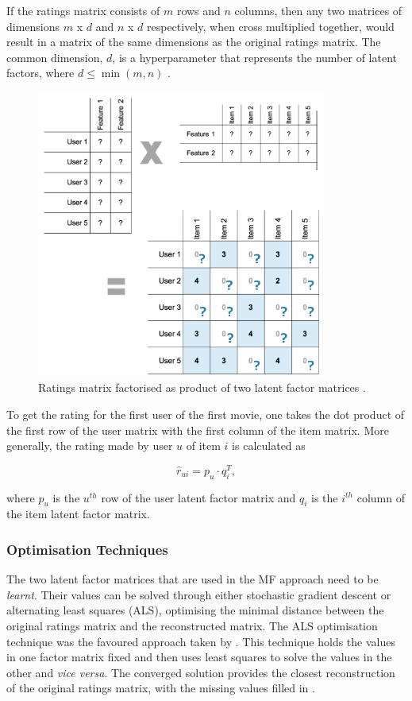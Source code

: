 If the ratings matrix consists of $m$ rows and $n$ columns, then any two matrices of dimensions $m$ x $d$ and $n$ x $d$ respectively, when cross multiplied together, would result in a matrix of the same dimensions as the original ratings matrix. The common dimension, $d$, is a hyperparameter that represents the number of latent factors, where $d \le \min(m,n)$ \parencite{bailey_2016}.

\begin{figure}[H]
\centering
\includegraphics[width=9.5cm]{Figures/2_4_matrix_factorization.png}
\decoRule
\caption[Matrix decomposition]{Ratings matrix factorised as product of two latent factor matrices \parencite{bailey_2016}.}
\label{fig:factors}
\end{figure}

To get the rating for the first user of the first movie, one takes the dot product of the first row of the user matrix with the first column of the item matrix. More generally, the rating made by user $u$ of item $i$ is calculated as

\begin{equation}
    \hat{r}_{ui} = p_u \cdot q_i^T,
\label{eqn:dot_prod}
\end{equation}

where $p_u$ is the $u^{th}$ row of the user latent factor matrix and $q_i$ is the $i^{th}$ column of the item latent factor matrix.

\subsubsection{Optimisation Techniques}
The two latent factor matrices that are used in the MF approach need to be \textit{learnt}. Their values can be solved through either stochastic gradient descent or alternating least squares (ALS), optimising the minimal distance between the original ratings matrix and the reconstructed matrix. The ALS optimisation technique was the favoured approach taken by \cite{bellkor_2008}. This technique holds the values in one factor matrix fixed and then uses least squares to solve the values in the other and \textit{vice versa}. The converged solution provides the closest reconstruction of the original ratings matrix, with the missing values filled in \parencite{koren2009matrix}.

